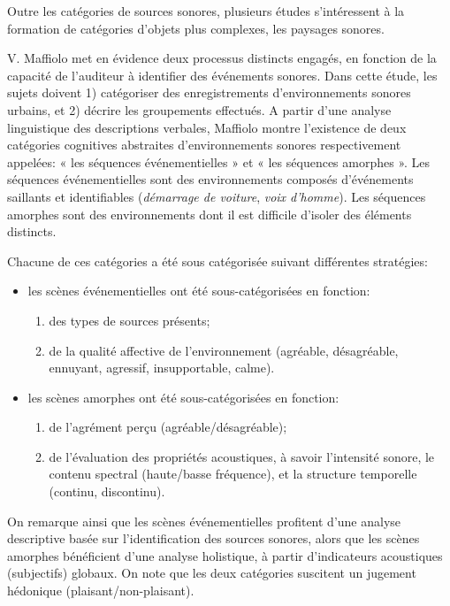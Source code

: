 Outre les catégories de sources sonores, plusieurs études s’intéressent à la formation de catégories d'objets plus complexes, les paysages sonores.

V. Maffiolo \citep{maffiolo_caracterisation_1999} met en évidence deux processus distincts engagés, en fonction de la capacité de l'auditeur à identifier des événements sonores. Dans cette étude, les sujets doivent 1) catégoriser des enregistrements d'environnements sonores urbains, et 2) décrire les groupements effectués. A partir d'une analyse linguistique des descriptions verbales, Maffiolo montre l'existence de deux catégories cognitives abstraites d'environnements sonores respectivement appelées: « les séquences événementielles » et « les séquences amorphes ». Les séquences événementielles sont des environnements composés d'événements saillants et identifiables (\emph{démarrage de voiture}, \emph{voix d'homme}). Les séquences amorphes sont des environnements dont il est difficile d'isoler des éléments distincts.

Chacune de ces catégories a été sous catégorisée suivant différentes stratégies:

\begin{itemize}
\item les scènes événementielles ont été sous-catégorisées en fonction:
\begin{enumerate}
\item des types de sources présents;
\item de la qualité affective de l'environnement (agréable, désagréable, ennuyant, agressif, insupportable, calme).
\end{enumerate}
\item les scènes amorphes ont été sous-catégorisées en fonction:
\begin{enumerate}
\item de l'agrément perçu (agréable/désagréable);
\item de l'évaluation des propriétés acoustiques, à savoir l'intensité sonore, le contenu spectral (haute/basse fréquence), et la structure temporelle (continu, discontinu).
\end{enumerate}
\end{itemize}

On remarque ainsi que les scènes événementielles profitent d'une analyse descriptive basée sur l'identification des sources sonores, alors que les scènes amorphes bénéficient d'une analyse holistique, à partir d'indicateurs acoustiques (subjectifs) globaux. On note que les deux catégories suscitent un jugement hédonique (plaisant/non-plaisant).


